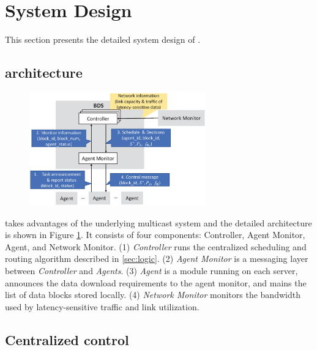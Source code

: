 \section{System Design}
\label{sec:system}

This section presents the detailed system design of \name.%

\subsection{\name architecture}
\label{subsec:system:architecture}

\begin{figure}[t]
  \centering
  \includegraphics[width=3in]{images/implementation_v2.eps}
  \label{fig:implementation}
\vspace{-0.4cm}
\end{figure}

\name takes advantages of the underlying multicast system and the detailed architecture is shown in Figure \ref{fig:implementation}. It consists of four components: Controller, Agent Monitor, Agent, and Network Monitor.
(1) \emph{Controller} runs the centralized scheduling and routing algorithm described in \Section\ref{sec:logic}. 
(2) \emph{Agent Monitor} is a messaging layer between \emph{Controller} and \emph{Agents}. 
(3) \emph{Agent} is a module running on each server, announces the data download requirements to the agent monitor, and mains the list of data blocks stored locally. 
(4) \emph{Network Monitor} monitors the bandwidth used by latency-sensitive traffic and link utilization.

\subsection{Centralized control}
\label{subsec:system:centralized}

